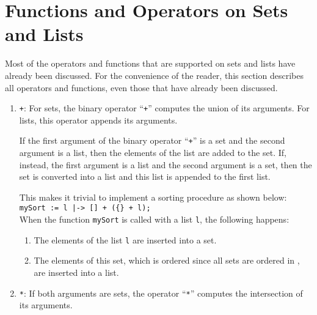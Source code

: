 \section{Functions and Operators on Sets and Lists}
Most of the operators and functions that are supported on sets and lists have already been
discussed.  For the convenience of the reader, this section describes all
operators and functions, even those that have already been discussed.  
\begin{enumerate}
\item \texttt{+}:  For sets, the binary operator ``\texttt{+}'' computes the union
      of its arguments.  For lists, this operator appends its arguments.

      If the first argument of the binary operator ``\texttt{+}'' is a set and the second argument
      is a list, then the elements of the list are added to the set.  If, instead, the first
      argument is a list and the second argument is a set, then the set is converted into a list and
      this list is appended to the first list.

      This makes it trivial to implement a sorting procedure as shown below:
      \\[0.2cm]
      \hspace*{1.3cm}
      \texttt{mySort := l |-> [] + (\{\} + l);}
      \\[0.2cm]
      When the function \texttt{mySort} is called with a list \texttt{l}, the following happens:
      \begin{enumerate}
      \item The elements of the list \texttt{l} are inserted into a set.  
      \item The elements of this set, which is ordered since all sets are ordered in \setlx, are
            inserted into a list.
      \end{enumerate}
\item \texttt{*}:  If both arguments are sets, the operator ``\texttt{*}'' computes the
      intersection of its arguments. 
      

\end{enumerate}
